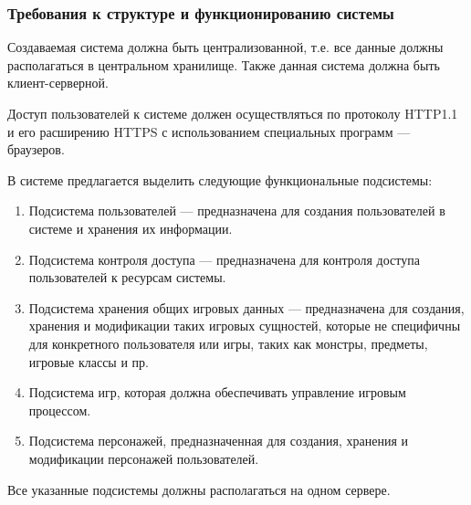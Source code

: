 \subsubsection{Требования к структуре и функционированию системы}

Создаваемая система должна быть централизованной, т.е. все данные должны располагаться в центральном хранилище. Также данная система должна быть клиент-серверной.

Доступ пользователей к системе должен осуществляться по протоколу HTTP1.1 и его расширению HTTPS с использованием специальных программ --- браузеров.

В системе предлагается выделить следующие функциональные подсистемы:
\begin{enumerate}
\item Подсистема пользователей --- предназначена для создания пользователей в системе и хранения их информации.
\item Подсистема контроля доступа --- предназначена для контроля доступа пользователей к ресурсам системы.
\item Подсистема хранения общих игровых данных --- предназначена для создания, хранения и модификации таких игровых сущностей, которые не специфичны для конкретного пользователя или игры, таких как монстры, предметы, игровые классы и пр.
\item Подсистема игр, которая должна обеспечивать управление игровым процессом.
\item Подсистема персонажей, предназначенная для создания, хранения и модификации персонажей пользователей.
\end{enumerate}

Все указанные подсистемы должны располагаться на одном сервере.
